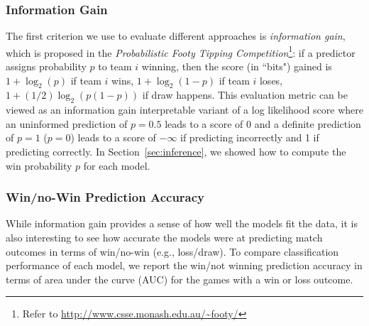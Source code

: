 \subsubsection{Information Gain}
\label{sec:informationGain}

The first criterion we use to evaluate different approaches is
\emph{information gain}, which is proposed in the \emph{Probabilistic Footy
Tipping Competition}\footnote{Refer to
\url{http://www.csse.monash.edu.au/~footy/}}: if a predictor assigns
probability $p$ to team $i$ winning, then the score (in ``bits")
gained is $1+\log_2(p)$ if team $i$ wins, $1+\log_2(1-p)$ if team $i$ loses, $1+(1/2)\log_2(p(1-p))$ if draw happens.
This evaluation metric can be viewed as an information gain
interpretable variant of a log likelihood score where an uninformed
prediction of $p=0.5$ leads to a score of 0 and a definite prediction
of $p=1$ ($p=0$) leads to a score of $-\infty$ if predicting
incorrectly and 1 if predicting correctly.
In Section~\ref{sec:inference}, we showed how to compute the win
probability $p$ for each model.

\subsubsection{Win/no-Win Prediction Accuracy}
\label{sec:WLPredictionAccuracy}

While information gain provides a sense of how well the models fit the
data, it is also interesting to see how accurate the models were at
predicting match outcomes in terms of win/no-win (e.g., loss/draw).  To compare
classification performance of each model, we report the
win/not winning prediction accuracy in terms of area under the curve (AUC) for the
games with a win or loss outcome. 



